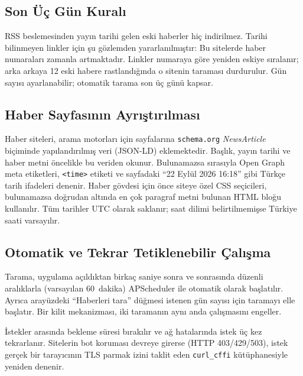 \documentclass[conference,a4paper]{IEEEtran}
\begin{document}
\subsection{Son Üç Gün Kuralı}
RSS beslemesinden yayın tarihi gelen eski haberler hiç indirilmez. Tarihi
bilinmeyen linkler için şu gözlemden yararlanılmıştır: Bu sitelerde haber
numaraları zamanla artmaktadır. Linkler numaraya göre yeniden eskiye sıralanır;
arka arkaya 12 eski habere rastlandığında o sitenin taraması durdurulur. Gün
sayısı ayarlanabilir; otomatik tarama son üç günü kapsar.

\subsection{Haber Sayfasının Ayrıştırılması}
Haber siteleri, arama motorları için sayfalarına \texttt{schema.org}
\emph{NewsArticle}~\cite{schemaorg} biçiminde yapılandırılmış veri (JSON-LD)
eklemektedir. Başlık, yayın tarihi ve haber metni öncelikle bu veriden okunur.
Bulunamazsa sırasıyla Open Graph meta etiketleri, \texttt{<time>} etiketi ve
sayfadaki ``22 Eylül 2026 16:18'' gibi Türkçe tarih ifadeleri denenir. Haber
gövdesi için önce siteye özel CSS seçicileri, bulunamazsa doğrudan altında en çok
paragraf metni bulunan HTML bloğu kullanılır. Tüm tarihler UTC olarak saklanır;
saat dilimi belirtilmemişse Türkiye saati varsayılır.

\subsection{Otomatik ve Tekrar Tetiklenebilir Çalışma}
Tarama, uygulama açıldıktan birkaç saniye sonra ve sonrasında düzenli
aralıklarla (varsayılan 60~dakika) APScheduler ile otomatik olarak başlatılır.
Ayrıca arayüzdeki ``Haberleri tara'' düğmesi istenen gün sayısı için taramayı
elle başlatır. Bir kilit mekanizması, iki taramanın aynı anda çalışmasını
engeller.

İstekler arasında bekleme süresi bırakılır ve ağ hatalarında istek üç kez
tekrarlanır. Sitelerin bot koruması devreye girerse (HTTP 403/429/503), istek
gerçek bir tarayıcının TLS parmak izini taklit eden \texttt{curl\_cffi}
kütüphanesiyle yeniden denenir.

\end{document}
